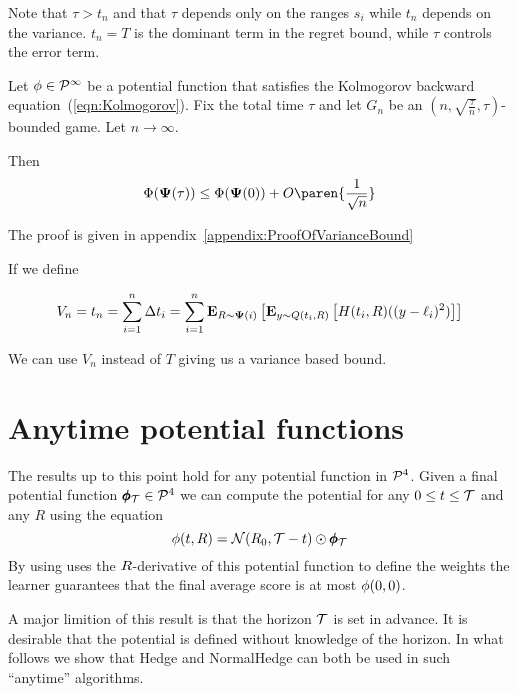 \documentclass{article}[12pt]
\begin{document}
Note that $\tau>t_n$ and that $\tau$ depends only on the ranges $s_i$
while $t_n$ depends on the variance. $t_n = T$ 
is the dominant term in the regret bound, while $\tau$ controls the
error term.

\newpage

\begin{theorem} \label{thm:variancebound} Let $\phi \in {\cal P}^{\infty}$
  be a potential function that satisfies the Kolmogorov backward
  equation~(\ref{eqn:Kolmogorov}).
  Fix the total time $\tau$ and let $G_n$ be an $(n,
  \sqrt{\frac{\tau}{n}},\tau)$-bounded game. Let $n \to \infty$.

Then 
$$\score(\state(\tau)) \leq \score(\state(0))+O\paren{\frac{1}{\sqrt{n}}}$$
\end{theorem}

The proof is given in appendix~\ref{appendix:ProofOfVarianceBound}

If we define

\begin{equation} \label{eqn:Vn}
  V_n = t_n = \sum_{i=1}^n \Delta t_i= 
  \sum_{i=1}^n {\bf E}_{R \sim {\bf \Psi}(i)}\left[ {\bf E}_{y \sim Q(t_i,R)}\left[ H(t_i,R) ((y-\ell_i)^2) \right] \right]
\end{equation}

We can use $V_n$ instead of $T$ giving us a variance based bound.

  

\section{Anytime potential functions}

The results up to this point hold for any potential function in
${\cal P}^{4}$. Given a final potential function $\pmb{\phi}_{\mathcal{T}} \in {\cal P}^{4}$ we
can compute the potential for any $0 \leq t \leq \mathcal{T}$ and any $R$ using the equation 
\begin{equation} \label{eqn:convol-with-normal}
\phi(t,R)={\cal N}(R_0,\mathcal{T}-t) \odot \pmb{\phi}_{\mathcal{T}}
\end{equation}
By using uses the $R$-derivative of this potential function to define
the weights the learner guarantees that the final average score is at
most $\phi(0,0)$.

A major limition of this result is that the horizon $\mathcal{T}$ is set in
advance.  It is desirable that the potential is defined without
knowledge of the horizon.  In what follows we show that Hedge and
NormalHedge can both be used in such ``anytime'' algorithms.
\end{document}
